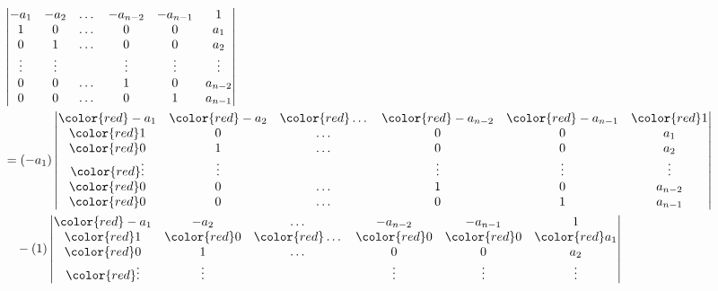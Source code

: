 \documentclass{report}
\theoremstyle{definition}
\theoremstyle{remark}
\begin{document}
  \begingroup
  \allowdisplaybreaks
  \begin{align}
    &\begin{vmatrix}
      - a_1
      &- a_2
      &\dots
      &- a_{n - 2}
      &- a_{n - 1}
      &1
      \\
      1
      &0
      &\dots
      &0
      &0
      &a_1
      \\
      0
      &1
      &\dots
      &0
      &0
      &a_2
      \\
      \vdots
      &\vdots
      &
      &\vdots
      &\vdots
      &\vdots
      \\
      0
      &0
      &\dots
      &1
      &0
      &a_{n - 2}
      \\
      0
      &0
      &\dots
      &0
      &1
      &a_{n - 1}
    \end{vmatrix}
    \\
    &=
    (- a_1)
    \begin{vmatrix}
      \color{red} - a_1
      &\color{red} - a_2
      &\color{red} \dots
      &\color{red} - a_{n - 2}
      &\color{red} - a_{n - 1}
      &\color{red} 1
      \\
      \color{red} 1
      &0
      &\dots
      &0
      &0
      &a_1
      \\
      \color{red} 0
      &1
      &\dots
      &0
      &0
      &a_2
      \\
      \color{red} \vdots
      &\vdots
      &
      &\vdots
      &\vdots
      &\vdots
      \\
      \color{red} 0
      &0
      &\dots
      &1
      &0
      &a_{n - 2}
      \\
      \color{red} 0
      &0
      &\dots
      &0
      &1
      &a_{n - 1}
    \end{vmatrix}
    \\
    &\quad
      - (1)
      \begin{vmatrix}
        \color{red} - a_1
        &- a_2
        &\dots
        &- a_{n - 2}
        &- a_{n - 1}
        &1
        \\
        \color{red} 1
        &\color{red} 0
        &\color{red} \dots
        &\color{red} 0
        &\color{red} 0
        &\color{red} a_1
        \\
        \color{red} 0
        &1
        &\dots
        &0
        &0
        &a_2
        \\
        \color{red} \vdots
        &\vdots
        &
        &\vdots
        &\vdots
        &\vdots
        \\

\end{vmatrix}
\end{align}
\end{document}

